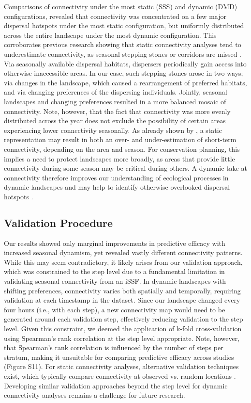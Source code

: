 \documentclass[abstract=on,10pt,a4paper,bibliography=totocnumbered]{article}
\begin{document}
Comparisons of connectivity under the most static (SSS) and dynamic (DMD)
configurations, revealed that connectivity was concentrated on a few major
dispersal hotspots under the most static configuration, but uniformly
distributed across the entire landscape under the most dynamic configuration.
This corroborates previous research showing that static connectivity analyses
tend to underestimate connectivity, as seasonal stepping stones or corridors are
missed \citep{Martensen.2017}. Via seasonally available dispersal habitats,
dispersers periodically gain access into otherwise inaccessible areas. In our
case, such stepping stones arose in two ways; via changes in the landscape,
which caused a rearrangement of preferred habitats, and via changing preferences
of the dispersing individuals. Jointly, seasonal landscapes and changing
preferences resulted in a more balanced mosaic of connectivity. Note, however,
that the fact that connectivity was more evenly distributed across the year does
not exclude the possibility of certain areas experiencing lower connectivity
seasonally. As already shown by \citet{Osipova.2019}, a static representation
may result in both an over- and under-estimation of short-term connectivity,
depending on the area and season. For conservation planning, this implies a need
to protect landscapes more broadly, as areas that provide little connectivity
during some season may be critical during others. A dynamic take at connectivity
therefore improves our understanding of ecological processes in dynamic
landscapes and may help to identify otherwise overlooked dispersal hotspots
\citep{Zeller.2020a}.

\subsection{Validation Procedure}

Our results showed only marginal improvements in predictive efficacy with
increased seasonal dynamism, yet revealed vastly different connectivity
patterns. While this may seem contradictory, it likely arises from our
validation approach, which was constrained to the step level due to a
fundamental limitation in validating seasonal connectivity from an iSSF. In
dynamic landscapes with shifting preferences, connectivity varies both spatially
and temporally, requiring validation at each timestamp in the dataset. Since our
landscape changed every four hours (i.e., with each step), a new connectivity
map would need to be generated around each validation step, effectively reducing
validation to the step level. Given this constraint, we deemed the application
of k-fold cross-validation using Spearman's rank correlation at the step level
appropriate. Note, however, that Spearman's rank correlation is influenced by
the number of steps per stratum, making it unsuitable for comparing predictive
efficacy across studies (Figure S11). For static connectivity analyses,
alternative validation techniques exist, which typically compare connectivity at
observed vs. random locations \citep{McClure.2016, Zeller.2018, Brennan.2020,
Finerty.2023}. Developing similar validation approaches beyond the step level
for dynamic connectivity analyses remains a challenge for future research.
\end{document}
